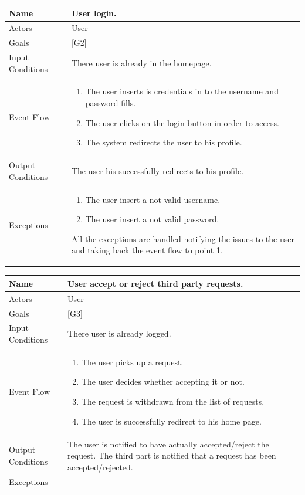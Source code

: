 \documentclass{article}
\begin{document}
\begin{center}
    \begin{tabular}{ | l | p{10cm} |}
    \hline
    Name & User login.\\ \hline
    Actors & User\\ \hline
   	Goals & {[G2]}\\ \hline
    Input Conditions & There user is already in the homepage.\\ \hline
    Event Flow & \begin{enumerate}
    	\item The user inserts is credentials in to the username and password fills.
		\item The user clicks on the login button in order to access.
		\item The system redirects the user to his profile.
    \end{enumerate} \\ \hline
    Output Conditions & The user his successfully redirects to his profile. \\ \hline
    Exceptions & \begin{enumerate}
    	\item The user insert a not valid username.
		\item The user insert a not valid password.
	\end{enumerate}
All the exceptions are handled notifying the issues to the user and taking back the event flow to point 1.
    \\ \hline
    \end{tabular}
\end{center}

\begin{center}
    \begin{tabular}{ | l | p{10cm} |}
    \hline
    Name & User accept or reject third party requests.\\ \hline
    Actors & User\\ \hline
   	Goals & {[G3]}\\ \hline
    Input Conditions & There user is already logged.\\ \hline
    Event Flow & \begin{enumerate}
    	\item The user picks up a request.
		\item The user decides whether accepting it or not.
		\item The request is withdrawn from the list of requests. 
		\item The user is successfully redirect to his home page. 
    \end{enumerate} \\ \hline
    Output Conditions & The user is notified to have actually accepted/reject the request. The third part is notified that a request has been accepted/rejected. \\ \hline
    Exceptions & - \\ \hline
    \end{tabular}
\end{center}
\end{document}
